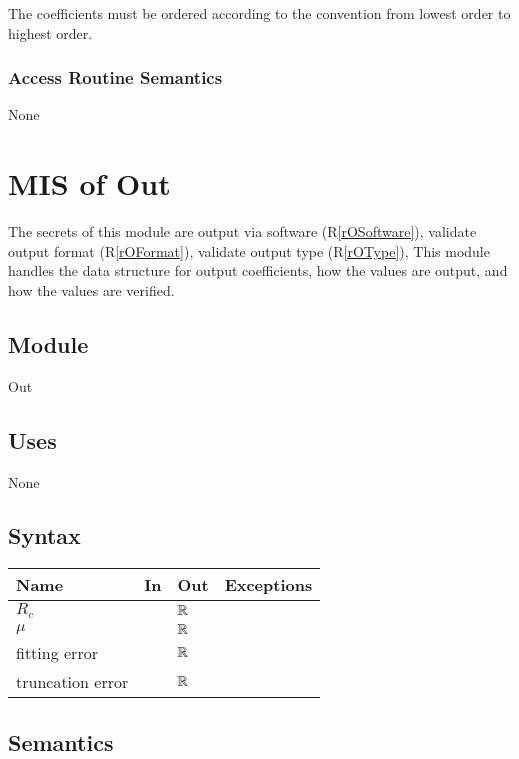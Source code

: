 \documentclass[12pt, titlepage]{article}
\newcommand{\rref}[1]{(R\ref{#1})}
\begin{document}
The coefficients must be ordered according to the convention from lowest order to highest order.

\subsubsection{Access Routine Semantics}

None


\newpage

\section{MIS of Out} \label{sc:MIS_OUT}

The secrets of this module are
 output via software \rref{rOSoftware},
 validate output format \rref{rOFormat},
 validate output type \rref{rOType},
This module handles the data structure for output coefficients,
 how the values are output,
 and how the values are verified.

\subsection{Module}

Out

\subsection{Uses}

None

\subsection{Syntax}

\begin{tabular}{p{3cm} p{2cm} p{4cm} >{\raggedright\arraybackslash}p{9cm}}
\toprule
\textbf{Name} & \textbf{In} & \textbf{Out} & \textbf{Exceptions} \\
\midrule
$R_c$            & & $\mathbb{R}$ &  \\
$\mu$            & & $\mathbb{R}$ &  \\
fitting error    & & $\mathbb{R}$ &  \\
truncation error & & $\mathbb{R}$ &  \\
\bottomrule
\end{tabular}

\subsection{Semantics}
\end{document}
